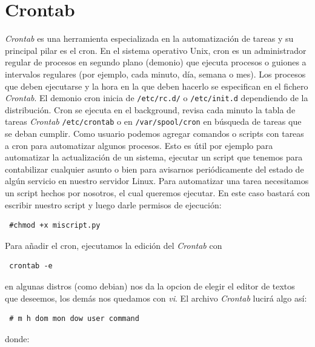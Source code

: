 \documentclass[a4paper, 12pt]{book}
\begin{document}
\section{Crontab}
\label{sec:crontab}
\textit{Crontab} es una herramienta especializada en la automatizaci\'on de tareas y su principal pilar es el cron. 
En el sistema operativo Unix, cron es un administrador regular de procesos en segundo plano (demonio) que ejecuta procesos o guiones a intervalos 
regulares (por ejemplo, cada minuto, d\'ia, semana o mes). Los procesos que deben ejecutarse y la hora en la que deben hacerlo se especifican en el fichero 
\textit{Crontab}.
El demonio cron inicia de \texttt{/etc/rc.d/} o \texttt{/etc/init.d} dependiendo de la distribuci\'on. Cron se ejecuta en el background, revisa cada minuto la tabla de tareas
\textit{Crontab} \texttt{/etc/crontab} o en \texttt{/var/spool/cron} en b\'usqueda de tareas que se deban cumplir. Como usuario podemos agregar comandos o scripts con tareas a cron 
para automatizar algunos procesos. Esto es \'util por ejemplo para automatizar la actualizaci\'on de un sistema, ejecutar un script que tenemos para 
contabilizar cualquier asunto o bien para avisarnos peri\'odicamente del estado de alg\'un servicio en nuestro servidor Linux.
Para automatizar una tarea necesitamos un script hechos por nosotros, el cual queremos ejecutar. En este caso bastar\'a con escribir nuestro script y 
luego darle permisos de ejecuci\'on: 
  \begin{verbatim} #chmod +x miscript.py \end{verbatim}
Para a\~nadir el cron, ejecutamos la edici\'on del \textit{Crontab} con \begin{verbatim} crontab -e \end{verbatim} en algunas distros (como debian) nos da la opcion 
de elegir el editor de textos que deseemos, los dem\'as nos quedamos con \textit{vi}. El archivo \textit{Crontab} lucir\'a algo as\'i: 
  \begin{verbatim} # m h dom mon dow user command \end{verbatim} donde:
\end{document}
